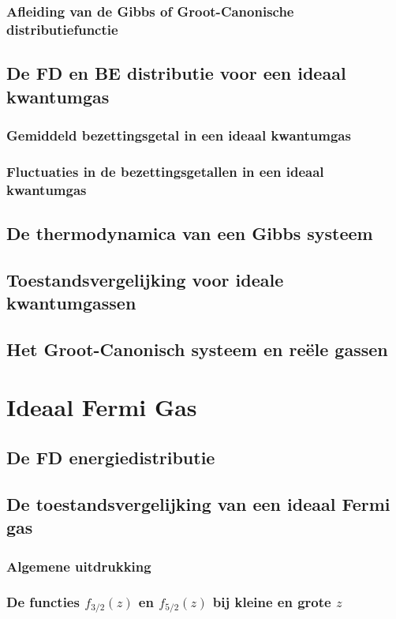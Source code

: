 \documentclass[a4paper,twoside]{article}
\theoremstyle{definition}
\theoremstyle{plain}
\begin{document}
\subsubsection{Afleiding van de Gibbs of Groot-Canonische distributiefunctie}
\subsection{De FD en BE distributie voor een ideaal kwantumgas}
\subsubsection{Gemiddeld bezettingsgetal in een ideaal kwantumgas}
\subsubsection{Fluctuaties in de bezettingsgetallen in een ideaal kwantumgas}
\subsection{De thermodynamica van een Gibbs systeem}
\subsection{Toestandsvergelijking voor ideale kwantumgassen}
\subsection{Het Groot-Canonisch systeem en re\"ele gassen}

\section{Ideaal Fermi Gas}
\subsection{De FD energiedistributie}
\subsection{De toestandsvergelijking van een ideaal Fermi gas}
\subsubsection{Algemene uitdrukking}
\subsubsection{De functies $f_{3/2}(z)$ en $f_{5/2}(z)$ bij kleine en grote $z$}
\end{document}
